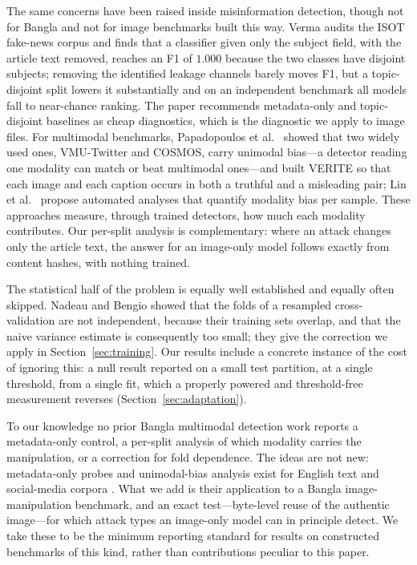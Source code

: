The same concerns have been raised inside misinformation detection, though not
for Bangla and not for image benchmarks built this way. Verma \cite{verma}
audits the ISOT fake-news corpus and finds that a classifier given only the
subject field, with the article text removed, reaches an F1 of $1.000$ because
the two classes have disjoint subjects; removing the identified leakage
channels barely moves F1, but a topic-disjoint split lowers it substantially
and on an independent benchmark all models fall to near-chance ranking. The
paper recommends metadata-only and topic-disjoint baselines as cheap
diagnostics, which is the diagnostic we apply to image files. For multimodal
benchmarks, Papadopoulos et al.\ \cite{verite} showed that two widely used
ones, VMU-Twitter and COSMOS, carry unimodal bias---a detector reading one
modality can match or beat multimodal ones---and built VERITE so that each
image and each caption occurs in both a truthful and a misleading pair; Lin et
al.\ \cite{linmodality} propose automated analyses that quantify modality bias
per sample. These approaches measure, through trained detectors, how much each
modality contributes. Our per-split analysis is complementary: where an attack
changes only the article text, the answer for an image-only model follows
exactly from content hashes, with nothing trained.

The statistical half of the problem is equally well established and equally
often skipped. Nadeau and Bengio \cite{nadeau} showed that the folds of a
resampled cross-validation are not independent, because their training sets
overlap, and that the naive variance estimate is consequently too small; they
give the correction we apply in Section~\ref{sec:training}. Our results include
a concrete instance of the cost of ignoring this: a null result reported on a
small test partition, at a single threshold, from a single fit, which a
properly powered and threshold-free measurement reverses
(Section~\ref{sec:adaptation}).

To our knowledge no prior Bangla multimodal detection work reports a
metadata-only control, a per-split analysis of which modality carries the
manipulation, or a correction for fold dependence. The ideas are not new:
metadata-only probes and unimodal-bias analysis exist for English text and
social-media corpora \cite{verma,verite}. What we add is their application to a
Bangla image-manipulation benchmark, and an exact test---byte-level reuse of
the authentic image---for which attack types an image-only model can in
principle detect. We take these to be the minimum reporting standard for
results on constructed benchmarks of this kind, rather than contributions
peculiar to this paper.

